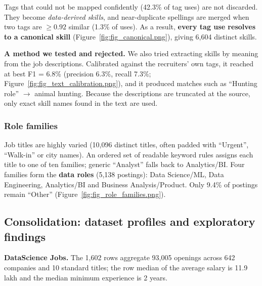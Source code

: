 Tags that could not be mapped confidently (42.3\% of tag uses) are not discarded. They become
\emph{data-derived skills}, and near-duplicate spellings are merged when two tags are
$\geq 0.92$ similar (1.3\% of uses). As a result, \textbf{every tag use resolves to a canonical skill}
(Figure~\ref{fig:fig_canonical.png}), giving 6,604 distinct skills.


\textbf{A method we tested and rejected.} We also tried extracting skills by meaning from the job
descriptions. Calibrated against the recruiters' own tags, it reached at best F1 = 6.8\%
(precision 6.3\%, recall 7.3\%; Figure~\ref{fig:fig_text_calibration.png}), and it produced
matches such as ``Hunting role'' $\rightarrow$ animal hunting. Because the descriptions are
truncated at the source, only exact skill names found in the text are used.


\subsubsection*{Role families}\label{sec:families}

Job titles are highly varied (10,096 distinct titles, often padded with ``Urgent'', ``Walk-in'' or city
names). An ordered set of readable keyword rules assigns each title to one of ten families; generic
``Analyst'' falls back to Analytics/BI. Four families form the \textbf{data roles} (5,138 postings):
Data Science/ML, Data Engineering, Analytics/BI and Business Analysis/Product. Only 9.4\% of postings
remain ``Other'' (Figure~\ref{fig:fig_role_families.png}).


\subsection{Consolidation: dataset profiles and exploratory findings}

\textbf{DataScience Jobs.} The 1,602 rows aggregate 93,005 openings across 642 companies and 10
standard titles; the row median of the average salary is 11.9 lakh and the median minimum experience
is 2 years.

